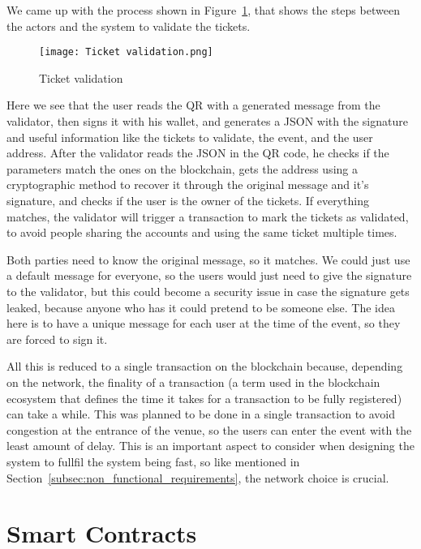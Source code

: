 We came up with the process shown in Figure~\ref{fig:ticket_validation}, that
shows the steps between the actors and the system to validate the tickets.

\begin{figure}[H]
	\texttt{[image: Ticket validation.png]}
	\centering
	\caption{Ticket validation}\label{fig:ticket_validation}
\end{figure}

Here we see that the user reads the QR with a generated message from the
validator, then signs it with his wallet, and generates a JSON with the
signature and useful information like the tickets to validate, the event, and
the user address. After the validator reads the JSON in the QR code, he checks
if the parameters match the ones on the blockchain, gets the address using a
cryptographic method to recover it through the original message and it's
signature, and checks if the user is the owner of the tickets. If everything
matches, the validator will trigger a transaction to mark the tickets as
validated, to avoid people sharing the accounts and using the same ticket
multiple times.

Both parties need to know the original message, so it matches. We could just
use a default message for everyone, so the users would just need to give the
signature to the validator, but this could become a security issue in case the
signature gets leaked, because anyone who has it could pretend to be someone
else. The idea here is to have a unique message for each user at the time of
the event, so they are forced to sign it.

All this is reduced to a single transaction on the blockchain because,
depending on the network, the finality of a transaction (a term used in the
blockchain ecosystem that defines the time it takes for a transaction to be
fully registered) can take a while. This was planned to be done in a single
transaction to avoid congestion at the entrance of the venue, so the users can
enter the event with the least amount of delay. This is an important aspect to
consider when designing the system to fullfil the system being fast, so like
mentioned in Section~\ref{subsec:non_functional_requirements}, the network
choice is crucial.

\section{Smart Contracts}\label{sec:smart_contracts}

